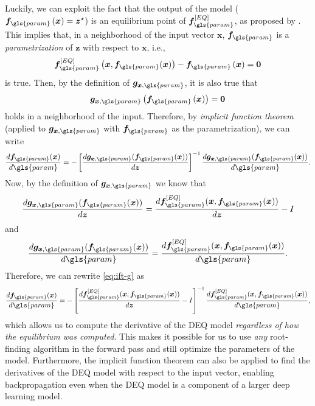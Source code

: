 Luckily, we can exploit the fact that the output of the model ($\bm{f}_{\gls{param}}\left( \bm{x} \right) = \bm{z}^{\star}$) is an equilibrium point of $\bm{f}_{\gls{param}}^{[EQ]}$, as proposed by \textcite{Bai2019}.
This implies that, in a neighborhood of the input vector $\bm{x}$, $\bm{f}_{\gls{param}}$ is a \emph{parametrization} of $\bm{z}$ with respect to $\bm{x}$, i.e., \[
    \bm{f}_{\gls{param}}^{[EQ]}\left( \bm{x},\bm{f}_{\gls{param}}(\bm{x}) \right) -\bm{f}_{\gls{param}}\left( \bm{x} \right) = \bm{0}
\] is true. Then, by the definition of $\bm{g}_{\bm{x},\gls{param}}$, it is also true that \[
\bm{g}_{\bm{x},\gls{param}}\left( \bm{f}_{\gls{param}}\left( \bm{x} \right) \right) = \bm{0}
\] holds in a neighborhood of the input.
Therefore, by \emph{implicit function theorem} (applied to $\bm{g}_{\bm{x},\gls{param}}$ with $\bm{f}_{\gls{param}}$ as the parametrization), we can write
\begin{equation}\label{eq:ift-g}
    \frac{d \bm{f}_{\gls{param}}(\bm{x})}{d \gls{param}} = - \left[ \frac{d \bm{g}_{\bm{x},\gls{param}}(\bm{f}_{\gls{param}}(\bm{x}))}{d \bm{z}} \right]^{-1} \frac{d \bm{g}_{\bm{x},\gls{param}}(\bm{f}_{\gls{param}}(\bm{x}))}{d \gls{param}}
.\end{equation}
Now, by the definition of $\bm{g}_{\bm{x},\gls{param}}$ we know that \[
    \frac{d \bm{g}_{\bm{x},\gls{param}}(\bm{f}_{\gls{param}}(\bm{x}))}{d \bm{z}} = \frac{d \bm{f}_{\gls{param}}^{[EQ]}(\bm{x},\bm{f}_{\gls{param}}(\bm{x}))}{d \bm{z}} - I 
\] and \[
\frac{d \bm{g}_{\bm{x},\gls{param}}(\bm{f}_{\gls{param}}(\bm{x}))}{d \gls{param}} = \frac{d \bm{f}_{\gls{param}}^{[EQ]}(\bm{x},\bm{f}_{\gls{param}}(\bm{x}))}{d \gls{param}}
.\] Therefore, we can rewrite \eqref{eq:ift-g} as
\begin{equation}\label{eq:deq-jacobian}
    \frac{d \bm{f}_{\gls{param}}(\bm{x})}{d \gls{param}} = - \left[ \frac{d \bm{f}_{\gls{param}}^{[EQ]}(\bm{x},\bm{f}_{\gls{param}}(\bm{x}))}{d \bm{z}} - I \right]^{-1} \frac{d \bm{f}_{\gls{param}}^{[EQ]}(\bm{x},\bm{f}_{\gls{param}}(\bm{x}))}{d \gls{param}}
,\end{equation}
which allows us to compute the derivative of the \gls{DEQ} model \emph{regardless of how the equilibrium was computed}.
This makes it possible for us to use \emph{any} root-finding algorithm in the forward pass and still optimize the parameters of the model.
Furthermore, the implicit function theorem can also be applied to find the derivatives of the DEQ model with respect to the input vector, enabling backpropagation even when the \gls{DEQ} model is a component of a larger deep learning model.

